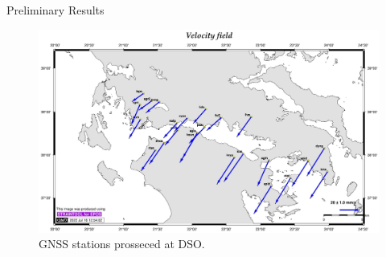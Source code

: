 \documentclass[final,a0,portrait]{beamer}
\newlength{\onecolwid}
\begin{document}
\begin{frame}[t]
\begin{columns}[t]
\begin{column}{\onecolwid}
\begin{block}{Preliminary Results}
{\begin{figure}
  \centering
  \includegraphics[width=1\onecolwid]{gsg2022_vel.jpg}
  \caption{GNSS stations prosseced at DSO.}
  \label{fig:grnets}
\end{figure}

}
\end{block}
\end{column}
\end{columns}
\end{frame}
\end{document}
